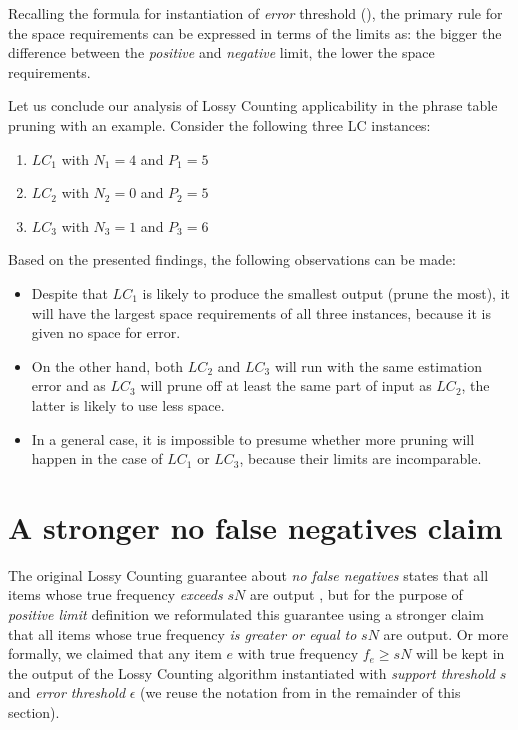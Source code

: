 Recalling the formula for instantiation of \emph{error} threshold (),
the primary rule for the space requirements can be expressed in terms of the limits as:
the bigger the difference between the \emph{positive} and \emph{negative} limit,
the lower the space requirements.

Let us conclude our analysis of Lossy Counting applicability in the phrase table pruning with
an example. Consider the following three LC instances:
\begin{enumerate}
  \item $LC_{1}$ with $N_{1}=4$ and $P_{1}=5$
  \item $LC_{2}$ with $N_{2}=0$ and $P_{2}=5$
  \item $LC_{3}$ with $N_{3}=1$ and $P_{3}=6$
\end{enumerate}

Based on the presented findings, the following observations can be made:
\begin{itemize}
  \item Despite that $LC_{1}$ is likely to produce the smallest output (prune the most),
    it will have the largest space requirements of all three instances, because it is given
    no space for error.
  \item On the other hand, both $LC_{2}$ and $LC_{3}$ will run with the same estimation error
    and as $LC_{3}$ will prune off at least the same part of input as $LC_{2}$, the latter is
    likely to use less space.
  \item In a general case, it is impossible to presume whether more pruning will happen
    in the case of $LC_{1}$ or $LC_{3}$, because their limits are incomparable.
\end{itemize}

\section{A stronger no false negatives claim}
\label{sec:positive-limit-validity}

The original Lossy Counting guarantee about \emph{no false negatives} states that all items
whose true frequency \emph{exceeds} $sN$ are output \citep[p. 3]{manku:lossycounting}, but
for the purpose of \emph{positive limit} definition we reformulated this guarantee using
a stronger claim that all items whose true frequency \emph{is greater or equal to} $sN$ are
output. Or more formally, we claimed that any item $e$ with true frequency $f_{e} \geq sN$
will be kept in the output of the Lossy Counting algorithm instantiated with
\emph{support threshold} $s$ and \emph{error threshold} $\epsilon$
(we reuse the notation from  in the remainder of this section).

